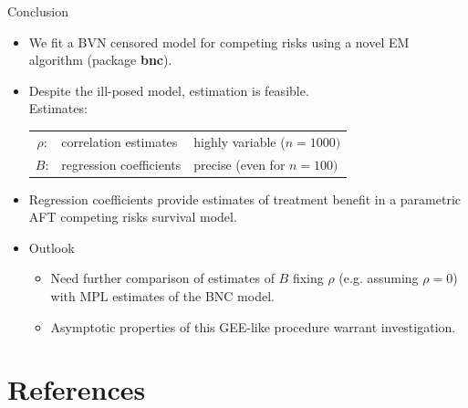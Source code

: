 \documentclass[10pt]{beamer}
\begin{document}
\begin{frame}{Conclusion}
  \begin{itemize}
  \item
    We fit a \alert{BVN censored model} for competing risks using a novel EM algorithm 
    (package \textbf{bnc}).
  \item
    Despite the \alert{ill-posed} model, estimation is feasible.\\
    Estimates: \\
    \begin{tabular}{ c l l }
    \hline
    $\rho$: &  \alert{correlation estimates} & highly variable ($n=1000)$ \\
    $B$: & \alert{regression coefficients}  &  precise (even for $n=100)$ \\ \hline  
    \end{tabular}
    
  \item Regression coefficients provide estimates of \alert{treatment benefit} 
  in a parametric \alert{AFT competing risks} survival model.
  \end{itemize}
  
  \begin{itemize}
  \item
    Outlook
    \begin{itemize}
    \item
      Need further comparison of estimates of $B$ fixing $\rho$ (e.g. assuming $\rho=0$) with MPL estimates of the BNC model.
    \item
      Asymptotic properties of this GEE-like procedure warrant investigation.
    \end{itemize}
  \end{itemize}
\end{frame}







\section*{References}\label{references}
\end{document}
